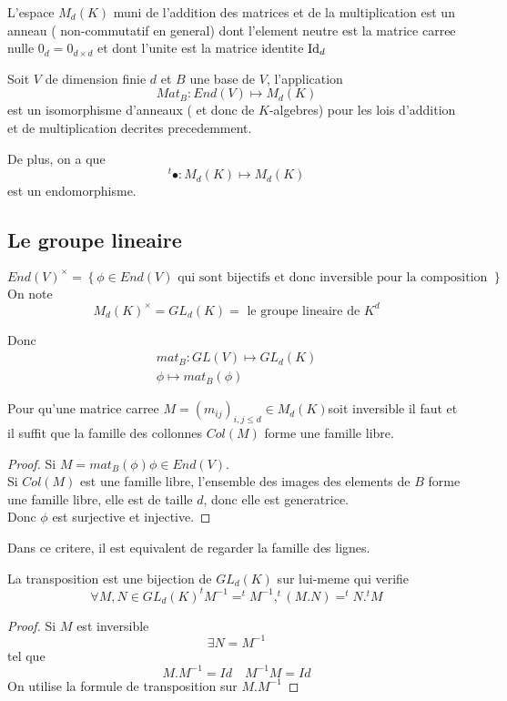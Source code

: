 \documentclass[../main.tex]{subfiles}
\begin{document}
\begin{thm}
	L'espace $M_d( K) $ muni de l'addition des matrices et de la multiplication est un anneau ( non-commutatif en general) dont l'element neutre est la matrice carree nulle $0_d = 0_{d\times d} $ et dont l'unite est la matrice identite $\operatorname*{Id}_d$
\end{thm}
\begin{thm}
	Soit $V$ de dimension finie $d$ et $B$ une base de $V$, l'application 
	\[ 
		Mat_B: End( V) \mapsto M_d( K) 
	\]
	est un isomorphisme d'anneaux ( et donc de $K $-algebres) pour les lois d'addition et de multiplication decrites precedemment.
\end{thm}
De plus, on a que
\[ 
	^{t}\bullet: M_d( K) \mapsto M_{d} ( K) 
\]
est un endomorphisme.
\subsection{Le groupe lineaire}
\[ 
	End( V) ^{\times}= \left\{ \phi \in End( V) \text{ qui sont bijectifs et donc inversible pour la composition  }  \right\} 
\]
On note
\[ 
	M_d( K) ^{\times}= GL_d( K) = \text{ le groupe lineaire de  } K^{d}
\]

Donc
\begin{align*}
mat_B: GL( V) \mapsto GL_d( K) \\
\phi \mapsto mat_B( \phi) 
\end{align*}
\begin{propo}
	Pour qu'une matrice carree $M= ( m_{ij} ) _{i,j\leq d} \in M_d( K) $soit inversible il faut et il suffit que la famille des collonnes $Col( M) $ forme une famille libre.
\end{propo}
\begin{proof}
	Si $M= mat_B( \phi) \phi\in End( V) $.\\
	Si $Col( M) $ est une famille libre, l'ensemble des images des elements de $B$ forme une famille libre, elle est de taille $d$, donc elle est generatrice.\\
	Donc $\phi$ est surjective et injective.
\end{proof}
\begin{rmq}
Dans ce critere, il est equivalent de regarder la famille des lignes.
\end{rmq}
\begin{propo}
	La transposition est une bijection de $GL_d( K) $ sur lui-meme qui verifie
	\[ 
		\forall M,N \in GL_d( K) ^{t}M^{-1}= ^{t}M^{-1}, ^{t}( M.N)= ^{t}N. ^{t}M
	\]
	
\end{propo}
\begin{proof}
Si $M$ est inversible
\[ 
\exists N= M^{-1}
\]
tel que
\[ 
M.M^{-1}= Id\quad M^{-1}M= Id
\]
On utilise la formule de transposition sur $M.M^{-1}$

\end{proof}
\end{document}
